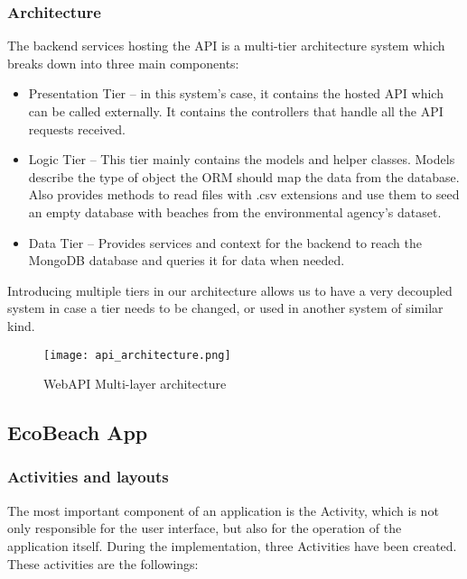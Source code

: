 \subsubsection{Architecture}

The backend services hosting the API is a multi-tier architecture system which breaks down into three main components:

\begin{itemize}
    \item Presentation Tier – in this system’s case, it contains the hosted API which can be called externally. It contains the controllers that handle all the API requests received.
    \item Logic Tier – This tier mainly contains the models and helper classes. Models describe the type of object the ORM should map the data from the database. Also provides methods to read files with .csv extensions and use them to seed an empty database with beaches from the environmental agency’s dataset.
    \item Data Tier – Provides services and context for the backend to reach the MongoDB database and queries it for data when needed. 
\end{itemize}

Introducing multiple tiers in our architecture allows us to have a very decoupled system in case a tier needs to be changed, or used in another system of similar kind. 

\begin{figure}[H]
    \centering
    \texttt{[image: api\_architecture.png]}
    \caption{WebAPI Multi-layer architecture}
    \label{fig:api_architecture}
\end{figure}

\subsection{EcoBeach App}\label{subsec:ecobeach-app}

\subsubsection{Activities and layouts}

The most important component of an application is the Activity, which is not only responsible for the user interface, but also for the operation of the application itself. During the implementation, three Activities have been created. These activities are the followings:

